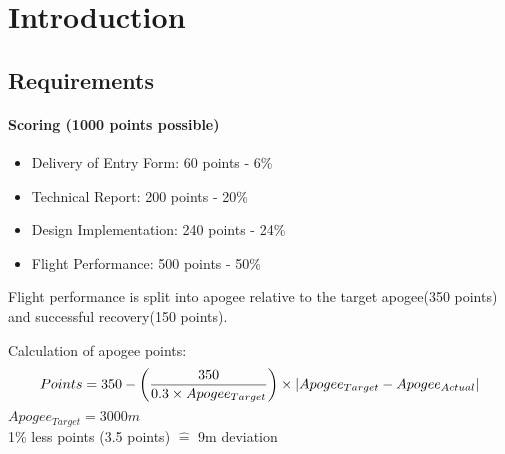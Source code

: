 \chapter{Introduction}

\section{Requirements}

\subsubsection{Scoring (1000 points possible)}
\begin{itemize}
 \item Delivery of Entry Form: 60 points - 6\%
 \item Technical Report: 200 points - 20\%
 \item Design Implementation: 240 points - 24\%
 \item Flight Performance: 500 points - 50\%
\end{itemize}


Flight performance is split into apogee relative to the target apogee(350 points) and successful recovery(150 points).
\par
Calculation of apogee points:
$$ Points = 350 - \left( \frac{350}{0.3 \times Apogee_{Target}} \right) \times \abs{Apogee_{Target} - Apogee_{Actual}} $$
$Apogee_{Target} = 3000m$ \\
1\% less points (3.5 points) $\widehat{=}$ 9m deviation